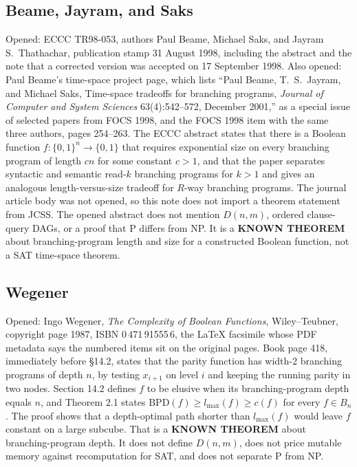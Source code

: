 \documentclass[11pt]{article}
\begin{document}
\subsection*{Beame, Jayram, and Saks}
Opened: ECCC TR98-053, authors Paul Beame, Michael Saks, and Jayram S.\ Thathachar, publication stamp 31 August 1998, including the abstract and the note that a corrected version was accepted on 17 September 1998.
Also opened: Paul Beame's time-space project page, which lists ``Paul Beame, T.\ S.\ Jayram, and Michael Saks, Time-space tradeoffs for branching programs, \emph{Journal of Computer and System Sciences} 63(4):542--572, December 2001,'' as a special issue of selected papers from FOCS 1998, and the FOCS 1998 item with the same three authors, pages 254--263.
The ECCC abstract states that there is a Boolean function \(f:\{0,1\}^n\to\{0,1\}\) that requires exponential size on every branching program of length \(cn\) for some constant \(c>1\), and that the paper separates syntactic and semantic read-\(k\) branching programs for \(k>1\) and gives an analogous length-versus-size tradeoff for \(R\)-way branching programs.
The journal article body was not opened, so this note does not import a theorem statement from JCSS.
The opened abstract does not mention \(D(n,m)\), ordered clause-query DAGs, or a proof that P differs from NP.
It is a \textbf{KNOWN THEOREM} about branching-program length and size for a constructed Boolean function, not a SAT time-space theorem.

\subsection*{Wegener}
Opened: Ingo Wegener, \emph{The Complexity of Boolean Functions}, Wiley--Teubner, copyright page 1987, ISBN 0\,471\,91555\,6, the LaTeX facsimile whose PDF metadata says the numbered items sit on the original pages.
Book page 418, immediately before \S14.2, states that the parity function has width-2 branching programs of depth \(n\), by testing \(x_{i+1}\) on level \(i\) and keeping the running parity in two nodes.
Section 14.2 defines \(f\) to be elusive when its branching-program depth equals \(n\), and Theorem 2.1 states \(\mathrm{BPD}(f)\ge l_{\max}(f)\ge c(f)\) for every \(f\in B_n\).
The proof shows that a depth-optimal path shorter than \(l_{\max}(f)\) would leave \(f\) constant on a large subcube.
That is a \textbf{KNOWN THEOREM} about branching-program depth.
It does not define \(D(n,m)\), does not price mutable memory against recomputation for SAT, and does not separate P from NP.
\end{document}
